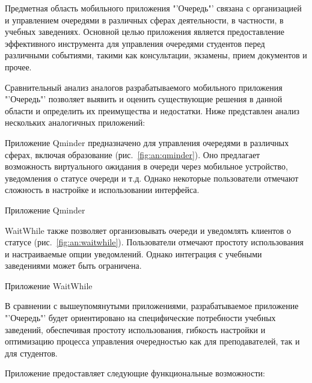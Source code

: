 

Предметная область мобильного приложения "'Очередь"' связана с организацией
и управлением очередями в различных сферах деятельности, в частности,
в учебных заведениях. Основной целью приложения является предоставление
эффективного инструмента для управления очередями студентов перед различными
событиями, такими как консультации, экзамены, прием документов и прочее.\par
Сравнительный анализ аналогов разрабатываемого мобильного
приложения "'Очередь"' позволяет выявить и оценить существующие решения
в данной области и определить их преимущества и недостатки.
Ниже представлен анализ нескольких аналогичных приложений:

Приложение Qminder предназначено
для управления очередями в различных сферах,
включая образование (рис.~\ref{fig:an:qminder}).
Оно предлагает возможность виртуального ожидания
в очереди через мобильное устройство,
уведомления о статусе очереди и т.д.
Однако некоторые пользователи отмечают сложность в настройке
и использовании интерфейса.

\begin{image}
	\caption{Приложение Qminder}
	\label{fig:an:qminder}
\end{image}

WaitWhile также позволяет организовывать
очереди и уведомлять клиентов о статусе (рис.~\ref{fig:an:waitwhile}).
Пользователи отмечают простоту использования
и настраиваемые опции уведомлений.
Однако интеграция с учебными заведениями может быть ограничена.

\begin{image}
	\caption{Приложение WaitWhile}
	\label{fig:an:waitwhile}
\end{image}

В сравнении с вышеупомянутыми приложениями,
разрабатываемое приложение "'Очередь"' будет ориентировано
на специфические потребности учебных заведений,
обеспечивая простоту использования, гибкость настройки
и оптимизацию процесса управления очередностью как для преподавателей,
так и для студентов.\par
Приложение предоставляет следующие функциональные возможности:

